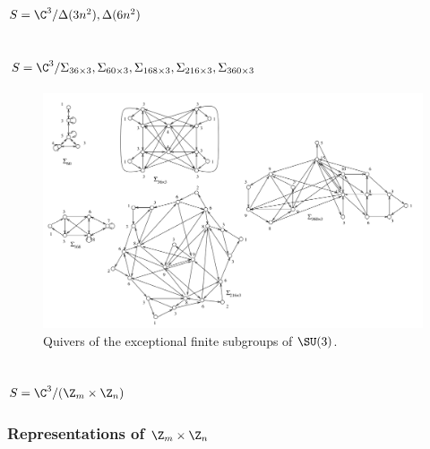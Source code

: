 \documentclass{worksheetclass}
\begin{document}
    \subsection{$S=\C^3/\Delta(3n^2),\Delta(6n^2)$}

    \subsection{$S=\C^3/\Sigma_{36\times 3},\Sigma_{60\times 3},\Sigma_{168\times 3},\Sigma_{216\times 3},\Sigma_{360\times 3}$}

        \begin{figure}[H]
            \centering
            \includegraphics[scale=0.4]{Pictures/SU3finitequivers.png}
            \caption{Quivers of the exceptional finite subgroups of $\SU(3)$.}
        \end{figure}

    \subsection{$S=\C^3/(\Z_m\times\Z_n)$}

        \subsubsection{Representations of $\Z_m\times\Z_n$}
\end{document}
